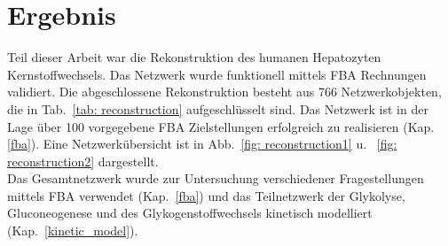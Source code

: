 \section{Ergebnis}
Teil dieser Arbeit war die Rekonstruktion des humanen Hepatozyten Kernstoffwechsels. Das Netzwerk wurde funktionell mittels FBA Rechnungen validiert. Die abgeschlossene Rekonstruktion besteht aus 766 Netzwerkobjekten, die in Tab.~\ref{tab: reconstruction} aufgeschlüsselt sind. Das Netzwerk ist in der Lage über 100 vorgegebene FBA Zielstellungen erfolgreich zu realisieren (Kap.\ref{fba}). Eine Netzwerkübersicht ist in Abb.~\ref{fig: reconstruction1} u. ~\ref{fig: reconstruction2} dargestellt.\\
Das Gesamtnetzwerk wurde zur Untersuchung verschiedener Fragestellungen mittels FBA verwendet (Kap.~\ref{fba}) und das Teilnetzwerk der Glykolyse, Gluconeogenese und des Glykogenstoffwechsels kinetisch modelliert (Kap.~\ref{kinetic_model}).
\small
